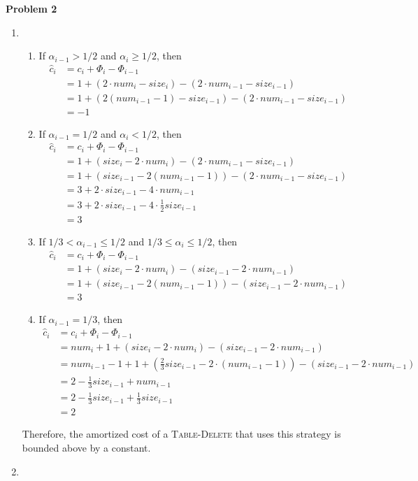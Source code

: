 \documentclass[12pt,letterpaper]{article}
\def\pp{\par\noindent}
\newcommand{\problem}[1]{ \bigskip \pp \textbf{Problem #1}\par}
\begin{document}
\problem{2}
\begin{enumerate}
	\item
		\begin{enumerate}
			\item If $\alpha_{i-1}>1/2$ and $\alpha_i\geq1/2$, then
				\begin{align*}
					\widehat{c}_i&=c_i+\Phi_i-\Phi_{i-1}\\
					&=1+(2\cdot num_i-size_i)-(2\cdot num_{i-1}-size_{i-1})\\
					&=1+(2(num_{i-1}-1)-size_{i-1})-(2\cdot num_{i-1}-size_{i-1})\\
					&=-1
				\end{align*}
			\item If $\alpha_{i-1}=1/2$ and $\alpha_i<1/2$, then
				\begin{align*}
					\widehat{c}_i&=c_i+\Phi_i-\Phi_{i-1}\\
					&=1+(size_i-2\cdot num_i)-(2\cdot num_{i-1}-size_{i-1})\\
					&=1+(size_{i-1}-2(num_{i-1}-1))-(2\cdot num_{i-1}-size_{i-1})\\
					&=3+2\cdot size_{i-1}-4\cdot num_{i-1}\\
					&=3+2\cdot size_{i-1}-4\cdot\frac{1}{2}size_{i-1}\\
					&=3
				\end{align*}
			\item If $1/3<\alpha_{i-1}\leq1/2$ and $1/3\leq\alpha_i\leq1/2$, then
				\begin{align*}
					\widehat{c}_i&=c_i+\Phi_i-\Phi_{i-1}\\
					&=1+(size_i-2\cdot num_i)-(size_{i-1}-2\cdot num_{i-1})\\
					&=1+(size_{i-1}-2(num_{i-1}-1))-(size_{i-1}-2\cdot num_{i-1})\\
					&=3
				\end{align*}
			\item If $\alpha_{i-1}=1/3$, then
				\begin{align*}
					\widehat{c}_i&=c_i+\Phi_i-\Phi_{i-1}\\
					&=num_i+1+(size_i-2\cdot num_i)-(size_{i-1}-2\cdot num_{i-1})\\
					&=num_{i-1}-1+1+(\frac{2}{3}size_{i-1}-2\cdot(num_{i-1}-1))-(size_{i-1}-2\cdot num_{i-1})\\
					&=2-\frac{1}{3}size_{i-1}+num_{i-1}\\
					&=2-\frac{1}{3}size_{i-1}+\frac{1}{3}size_{i-1}\\
					&=2
				\end{align*}
		\end{enumerate}
		Therefore, the amortized cost of a \textsc{Table-Delete} that uses this strategy is bounded above by a constant.
	\item
\end{enumerate}
\end{document}
